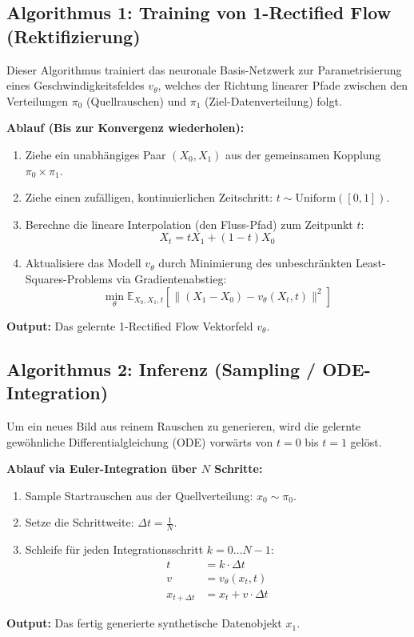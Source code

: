 \documentclass[11pt,a4paper]{article}
\begin{document}
\subsection{Algorithmus 1: Training von 1-Rectified Flow (Rektifizierung)}
Dieser Algorithmus trainiert das neuronale Basis-Netzwerk zur Parametrisierung eines Geschwindigkeitsfeldes $v_\theta$, welches der Richtung linearer Pfade zwischen den Verteilungen $\pi_0$ (Quellrauschen) und $\pi_1$ (Ziel-Datenverteilung) folgt.

\textbf{Ablauf (Bis zur Konvergenz wiederholen):}
\begin{enumerate}
    \item Ziehe ein unabhängiges Paar $(X_0, X_1)$ aus der gemeinsamen Kopplung $\pi_0 \times \pi_1$.
    \item Ziehe einen zufälligen, kontinuierlichen Zeitschritt: $t \sim \text{Uniform}([0, 1])$.
    \item Berechne die lineare Interpolation (den Fluss-Pfad) zum Zeitpunkt $t$:
    \begin{equation}
        X_t = t X_1 + (1 - t) X_0
    \end{equation}
    \item Aktualisiere das Modell $v_\theta$ durch Minimierung des unbeschränkten Least-Squares-Problems via Gradientenabstieg:
    \begin{equation}
        \min_\theta \mathbb{E}_{X_0, X_1, t} \left[ \| (X_1 - X_0) - v_\theta(X_t, t) \|^2 \right]
    \end{equation}
\end{enumerate}
\textbf{Output:} Das gelernte 1-Rectified Flow Vektorfeld $v_\theta$.

\subsection{Algorithmus 2: Inferenz (Sampling / ODE-Integration)}
Um ein neues Bild aus reinem Rauschen zu generieren, wird die gelernte gewöhnliche Differentialgleichung (ODE) vorwärts von $t=0$ bis $t=1$ gelöst.

\textbf{Ablauf via Euler-Integration über $N$ Schritte:}
\begin{enumerate}
    \item Sample Startrauschen aus der Quellverteilung: $x_0 \sim \pi_0$.
    \item Setze die Schrittweite: $\Delta t = \frac{1}{N}$.
    \item Schleife für jeden Integrationsschritt $k = 0 \dots N-1$:
    \begin{align}
        t &= k \cdot \Delta t \\
        v &= v_\theta(x_t, t) \\
        x_{t + \Delta t} &= x_t + v \cdot \Delta t
    \end{align}
\end{enumerate}
\textbf{Output:} Das fertig generierte synthetische Datenobjekt $x_1$.
\end{document}
